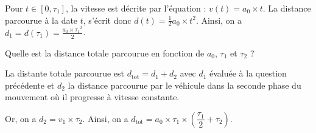 \begin{corrige}
Pour $t\in[0, \tau_1]$, la vitesse est décrite par l'équation : $v(t) = a_0\times t$. 
La distance parcourue à la date $t$, s'écrit donc $d(t)=\frac{1}{2}a_0\times t^2$. Ainsi, on a $d_1=d(\tau_1)=\frac{a_0\times{\tau_1}^2}{2}$.
\end{corrige}




\begin{enonce}
	Quelle est la distance totale parcourue en fonction de $a_0$, $\tau_1$ et $\tau_2$ ?
\end{enonce}


\begin{corrige}
	La distante totale parcourue est $d_{\text{tot}} = d_1+d_2$ avec  $d_1$ évaluée à la question précédente et $d_2$ la distance parcourue par le véhicule dans la seconde phase du mouvement où il progresse à vitesse constante. 
	
	Or, on a  $d_2 = v_1 \times \tau_2$. Ainsi, on a $d_{\text{tot}} = 
	a_0 \times \tau_1 \times\left(\dfrac{\tau_1}{2} + \tau_2\right)$.
\end{corrige}


\finEntrainement




\hauteurLargeurCadreReponse		{7mm}{1.5cm}
\initialisationEntrainement


